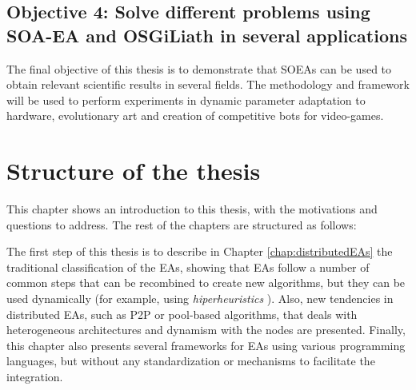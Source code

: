 

\newcommand{\objectiveresearch}{Solve different problems using SOA-EA and OSGiLiath in several applications}
\subsection*{Objective 4: \objectiveresearch}
\label{subsec:intro:obj:applications}
The final objective of this thesis is to demonstrate that SOEAs can be used to obtain relevant scientific results in several fields. The methodology and framework will be used to perform experiments in dynamic parameter adaptation to hardware, evolutionary art and creation of competitive bots for video-games.



\section{Structure of the thesis}
\label{sec:intro:structure}

This chapter shows an introduction to this thesis, with the
motivations and questions to address. %
The rest of the chapters are structured as follows:

The first step of this thesis is to describe in Chapter \ref{chap:distributedEAs} the traditional classification of the EAs, showing that EAs follow a number of common steps that can be recombined to create new algorithms, but they can be used dynamically (for example, using {\em hiperheuristics} \cite{cowling2001hyperheuristic}). Also, new tendencies in distributed EAs, such as P2P or pool-based algorithms, that deals with heterogeneous architectures and dynamism with the nodes are presented. Finally, this chapter also presents several frameworks for EAs using various programming languages, but without any standardization or mechanisms to facilitate the integration.

